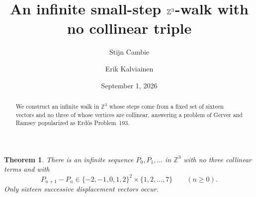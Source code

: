 \documentclass[10pt]{article}
\title{An infinite small-step $\Z^3$-walk with no collinear triple}
\author{Stijn Cambie \and Erik Kalviainen}
\date{September 1, 2026}
\newtheorem{theorem}{Theorem}
\newcommand{\Z}{\mathbb Z}
\begin{document}
\maketitle

\begin{abstract}
We construct an infinite walk in $\Z^3$ whose steps come from a fixed set of
sixteen vectors and no three of whose vertices are collinear, answering a
problem of Gerver and Ramsey popularized as Erd\H{o}s Problem~193.
\end{abstract}

\begin{theorem}
There is an infinite sequence $P_0,P_1,\ldots$ in $\Z^3$ with no three
collinear terms and with
\[
 P_{n+1}-P_n\in\{-2,-1,0,1,2\}^2\times\{1,2,\ldots,7\}
 \qquad(n\geq0).
\]
Only sixteen successive displacement vectors occur.
\end{theorem}
\end{document}
